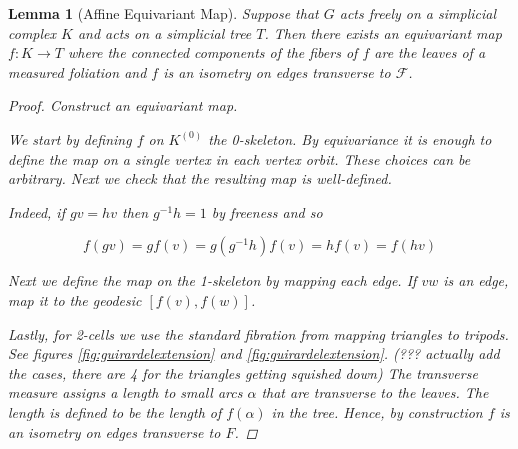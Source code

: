 \documentclass[12pt,parskip=full]{report}
\theoremstyle{plain}
\newtheorem{lem}[thm]{Lemma}
\theoremstyle{definition}
\begin{document}
\begin{lem}
    [Affine Equivariant Map]
    \label{lem:affineequivariantmap} 
    Suppose that \(G\) acts freely on a simplicial complex \(K\) and acts on a simplicial tree \(T\). Then there exists an equivariant map \(f: K \to T\) where the connected components of the fibers of \(f\) are the leaves of a measured foliation and \(f\) is an isometry on edges transverse to \(\mathscr{F}\).
    \begin{proof}
        Construct an equivariant map.

        We start by defining \(f\) on \(K^{(0)}\) the 0-skeleton. By equivariance it is enough to define the map on a single vertex in each vertex orbit. These choices can be arbitrary. Next we check that the resulting map is well-defined. 
        
        Indeed, if \(gv=hv\) then \(g^{-1} h = 1\) by freeness and so
        
        \[ f(gv) = gf(v) = g(g^{-1}h)f(v) = hf(v) = f(hv) \]
        
        Next we define the map on the 1-skeleton by mapping each edge. If \(vw\) is an edge, map it to the geodesic \([f(v), f(w)]\). 
        
        Lastly, for 2-cells we use the standard fibration from mapping triangles to tripods. See figures \ref{fig:guirardelextension} and \ref{fig:guirardelextension}. (??? actually add the cases, there are 4 for the triangles getting squished down) The transverse measure assigns a length to small arcs \(\alpha\) that are transverse to the leaves. The length is defined to be the length of \(f(\alpha)\) in the tree. Hence, by construction \(f\) is an isometry on edges transverse to \(F\).
    \end{proof}
\end{lem}


\end{document}

